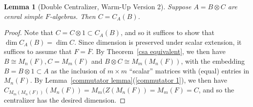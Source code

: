 \documentclass[12pt]{report}
\theoremstyle{plain}
\newtheorem{lem}[thm]{Lemma}
\newcommand{\ov}{\overline}
\begin{document}
\begin{lem}[Double Centralizer, Warm-Up Version 2] \label{dc2} 
Suppose $A = B \otimes C$ are cenral simple $F$-algebras. Then $C =
C_A(B)$.
\end{lem}
\begin{proof}
Note that $C = C \otimes 1 \subset C_A(B)$, and so it suffices to show that
$\dim C_A(B) = \dim C$. Since dimension is preserved under scalar
extension, it suffices to assume that $F = \ov F$. By Theorem~\ref{csa
equivalent}, we then have $B \cong M_n(F), C = M_m(F)$ and $B \otimes C
\cong M_m(M_n(F))$, with the embedding $B = B \otimes 1 \subset A$ as the
inclusion of $m \times m$ ``scalar'' matrices with (equal) entries in
$M_n(F)$. By Lemma~\ref{commutator lemma}(\ref{commutator 1}), we then have
$C_{M_m(M_n(F))}(M_n(F)) = M_m(Z(M_n(F)) = M_m(F) = C$, and so the
centralizer has the desired dimension.
\end{proof}
\end{document}
